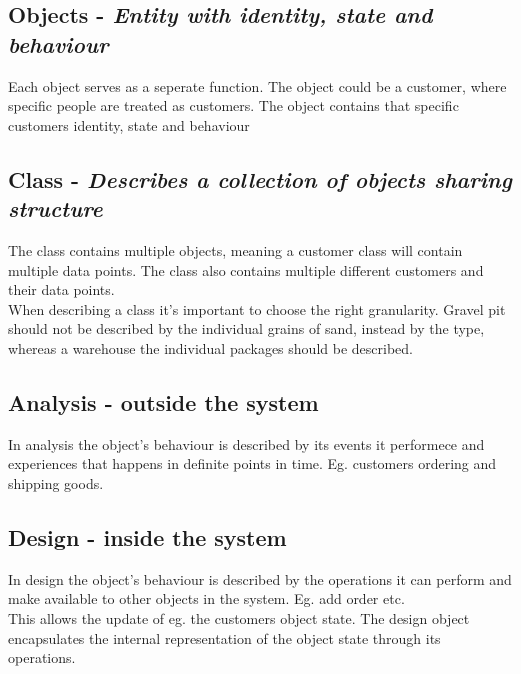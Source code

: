 \subsection*{Objects - \it{Entity with identity, state and behaviour}}
Each object serves as a seperate function. The object could be a customer, where specific people are treated as customers. The object contains that specific customers identity, state and behaviour

\subsection*{Class - \it{Describes a collection of objects sharing structure}}
The class contains multiple objects, meaning a customer class will contain multiple data points. The class also contains multiple different customers and their data points.\\
When describing a class it's important to choose the right granularity. Gravel pit should not be described by the individual grains of sand, instead by the type, whereas a warehouse the individual packages should be described.\\

\subsection*{Analysis - outside the system}
In analysis the object's behaviour is described by its events it performece and experiences that happens in definite points in time. Eg. customers ordering and shipping goods.\\

\subsection*{Design - inside the system}
In design the object's behaviour is described by the operations it can perform and make available to other objects in the system. Eg. add order etc. \\
This allows the update of eg. the customers object state. The design object encapsulates the internal representation of the object state through its operations.\\

